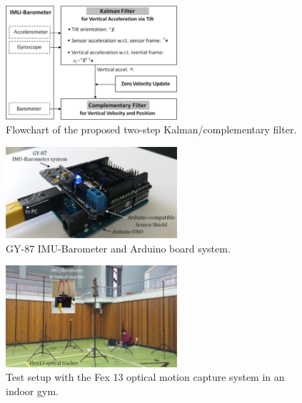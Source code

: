 \documentclass[10pt,journal,compsoc]{IEEEtran}
\begin{document}
\begin{figure}[!t]
\centering
\includegraphics[width=2.5in]{fig1}
    \caption{Flowchart of the proposed two-step Kalman/complementary filter.}
\label{fig1}
\end{figure}

\begin{figure}[!t]
\centering
\includegraphics[width=2.5in]{fig2}
\caption{GY-87 IMU-Barometer and Arduino board system.}
\label{fig2}
\end{figure}

\begin{figure}[!t]
\centering
\includegraphics[width=2.5in]{fig3}
\caption{Test setup with the Fex 13 optical motion capture system in an indoor gym.}
\label{fig3}
\end{figure}
\end{document}
